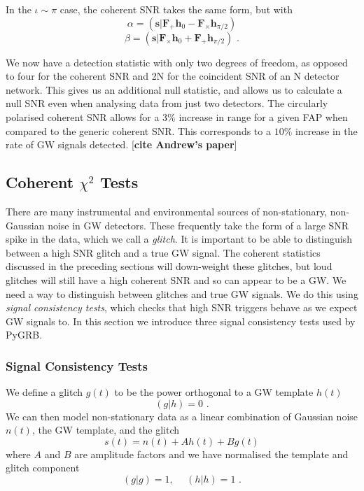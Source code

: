 \documentclass[11pt]{cuthesis}
\newcommand{\fs}{\text{ .}}
\begin{document}
In the $\iota \sim \pi$ case, the coherent SNR takes the same form, but with
\begin{equation}
\alpha = (\textbf{s}|\textbf{F}_+\textbf{h}_0 - \textbf{F}_\times \textbf{h}_{\pi /2} )
\end{equation}
\begin{equation}
\beta =  (\textbf{s}|\textbf{F}_\times\textbf{h}_0 + \textbf{F}_+ \textbf{h}_{\pi /2} ) \fs
\end{equation}

We now have a detection statistic with only two degrees of freedom, as opposed to four for the coherent SNR and 2N for the coincident SNR of an N detector network. This gives us an additional null statistic, and allows us to calculate a null SNR even when analysing data from just two detectors. The circularly polarised coherent SNR allows for a $3\%$ increase in range for a given FAP when compared to the generic coherent SNR. This corresponds to a $10\%$ increase in the rate of GW signals detected. [\textbf{cite Andrew's paper}]

\subsection{Coherent $\chi^2$ Tests} \label{sec:coh chisq}
There are many instrumental and environmental sources of non-stationary, non-Gaussian noise in GW detectors. These frequently take the form of a large SNR spike in the data, which we call a \textit{glitch}. It is important to be able to distinguish between a high SNR glitch and a true GW signal.  The coherent statistics discussed in the preceding sections will down-weight these glitches, but loud glitches will still have a high coherent SNR and so can appear to be a GW. We need a way to distinguish between glitches and true GW signals. We do this using \textit{signal consistency tests}, which checks that high SNR triggers behave as we expect GW signals to. In this section we introduce three signal consistency tests used by PyGRB.

\subsubsection{ Signal Consistency Tests }
We define a glitch $g(t)$ to be the power orthogonal to a GW template $h(t)$
\begin{equation}
(g|h)=0 \fs
\end{equation}
We can then model non-stationary data as a linear combination of Gaussian noise $n(t)$, the GW template, and the glitch
\begin{equation}
s(t) = n(t) + Ah(t) + Bg(t)
\end{equation}
where $A$ and $B$ are amplitude factors and we have normalised the template and glitch component
\begin{equation}
(g|g)=1, \hspace{15pt} (h|h)=1 \fs
\end{equation}
\end{document}
